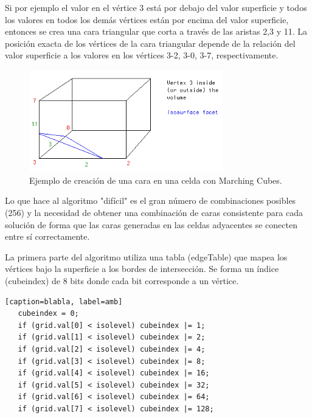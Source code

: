 \documentclass[12pt]{article}
\begin{document}
Si por ejemplo el valor en el vértice 3 está por debajo del valor superficie y todos los valores en todos los demás vértices están por encima del valor superficie, entonces se crea una cara triangular que corta a través de las aristas 2,3 y 11. La posición exacta de los vértices de la cara triangular depende de la relación del valor superficie a los valores en los vértices 3-2, 3-0, 3-7, respectivamente.
\begin{figure}[h!]
\includegraphics[width=0.75\textwidth,center]{marchingcubes2.png}
\caption{Ejemplo de creación de una cara en una celda con Marching Cubes.}
\end{figure}
Lo que hace al algoritmo "difícil" es el gran número de combinaciones posibles (256) y la necesidad de obtener una combinación de caras consistente para cada solución de forma que las caras generadas en las celdas adyacentes se conecten entre sí correctamente.

La primera parte del algoritmo utiliza una tabla (edgeTable) que mapea los vértices bajo la superficie a los bordes de intersección. Se forma un índice (cubeindex) de 8 bits donde cada bit corresponde a un vértice.
\lstset{language=C}          %

\begin{lstlisting}[frame=single][caption=blabla, label=amb]
   cubeindex = 0;
   if (grid.val[0] < isolevel) cubeindex |= 1;
   if (grid.val[1] < isolevel) cubeindex |= 2;
   if (grid.val[2] < isolevel) cubeindex |= 4;
   if (grid.val[3] < isolevel) cubeindex |= 8;
   if (grid.val[4] < isolevel) cubeindex |= 16;
   if (grid.val[5] < isolevel) cubeindex |= 32;
   if (grid.val[6] < isolevel) cubeindex |= 64;
   if (grid.val[7] < isolevel) cubeindex |= 128;
\end{lstlisting}
\end{document}
